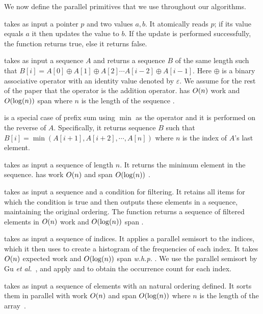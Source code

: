 We now define the parallel primitives that we use throughout our algorithms.

 takes as input a pointer $p$ and two values $a,b$. It atomically reads $p$; if its value equals $a$ it then updates the value to $b$. If the update is performed successfully, the function returns true, else it returns false.  


 takes as input a sequence $A$ and returns a sequence $B$ of the same length such that $B[i] = A[0]\oplus A[1]\oplus A[2]\cdots A[i-2]\oplus A[i-1]$. Here $\oplus$ is a binary associative operator with an identity value denoted by $\varepsilon$. We assume for the rest of the paper that the operator is the addition operator.  has $O(n)$ work and $O(\log(n))$ span where $n$ is the length of the sequence \cite{CLRS}.

 is a special case of prefix sum using $\min$ as the operator and it is performed on the reverse of $A$. Specifically, it returns sequence $B$ such that $B[i] = \min(A[i+1],A[i+2],\cdots,A[n])$ where $n$ is the index of $A$'s last element.  

 takes as input a sequence of length $n$. It returns the minimum element in the sequence.  has work $O(n)$ and span $O(\log(n))$ \cite{CLRS}. 

 takes as input a sequence and a condition for filtering. It retains all items for which the condition is true and then outputs these elements in a sequence, maintaining the original ordering. The function returns a sequence of filtered elements in $O(n)$ work and $O(\log(n))$ span \cite{CLRS}.

 takes as input a sequence of indices. It applies a parallel semisort to the indices, which it then uses to create a histogram of the frequencies of each index. It takes $O(n)$ expected work and $O(\log(n))$ span \textit{w.h.p.} \cite{GuShSuBl15}. We use the parallel semisort by Gu \textit{et al.}~\cite{GuShSuBl15}, and apply  and  to obtain the occurrence count for each index.

 takes as input a sequence of elements with an natural ordering defined. It sorts them in parallel with work $O(n)$ and span $O(\log(n))$ where $n$ is the length of the array~\cite{Rajasekaran89,Blelloch91,shun2012brief,Zagha91}.